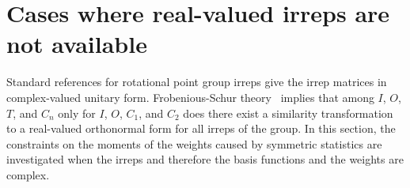 \section{Cases where real-valued irreps are not available}
\label{sec:constraintsonthemomentsoftheweights:complex}
Standard references for rotational point group irreps give the irrep
matrices in complex-valued unitary form.
Frobenious-Schur theory~\cite[p.~129, Theorem~III]{Cornwell1984} implies
that
among $I$, $O$, $T$, and $C_n$
only for $I$, $O$, $C_1$, and $C_2$ does there exist a similarity
transformation to a real-valued orthonormal form for all irreps of the group.
In this section, the constraints on the moments of the weights caused by
symmetric statistics are investigated when the irreps and therefore the
basis functions and the weights are complex.
\par
